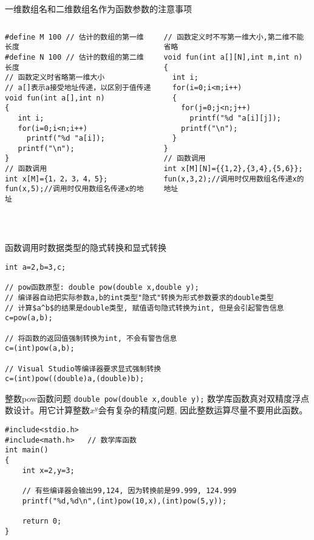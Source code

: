 \begin{frame}{一维数组名和二维数组名作为函数参数的注意事项}
\vspace{-0.4cm}
\begin{columns}[T]
\begin{lstlisting}
#define M 100 // 估计的数组的第一维长度
#define N 100 // 估计的数组的第二维长度
// 函数定义时省略第一维大小
// a[]表示a接受地址传递，以区别于值传递
void fun(int a[],int n)
{
   int i;
   for(i=0;i<n;i++) 
     printf("%d "a[i]);
   printf("\n");
}
// 函数调用
int x[M]={1，2，3，4，5};
fun(x,5);//调用时仅用数组名传递x的地址
\end{lstlisting}
\begin{lstlisting}[frame=leftline]
// 函数定义时不写第一维大小,第二维不能省略
void fun(int a[][N],int m,int n)
{
  int i;
  for(i=0;i<m;i++)
  {
    for(j=0;j<n;j++) 
      printf("%d "a[i][j]);
    printf("\n");
  }
}
// 函数调用
int x[M][N]={{1,2},{3,4},{5,6}};
fun(x,3,2);//调用时仅用数组名传递x的地址
\end{lstlisting}
\end{columns}
~\\
\end{frame}

\begin{frame}{函数调用时数据类型的隐式转换和显式转换}
\begin{lstlisting}
int a=2,b=3,c;

// pow函数原型: double pow(double x,double y);
// 编译器自动把实际参数a,b的int类型"隐式"转换为形式参数要求的double类型
// 计算$a^b$的结果是double类型, 赋值语句隐式转换为int, 但是会引起警告信息
c=pow(a,b);  

// 将函数的返回值强制转换为int, 不会有警告信息
c=(int)pow(a,b); 

// Visual Studio等编译器要求显式强制转换
c=(int)pow((double)a,(double)b); 

\end{lstlisting}
\end{frame}

\begin{frame}{整数pow函数问题}
\vspace{-0.3cm}
\lstinline|double pow(double x,double y);| 数学库函数真对双精度浮点数设计。用它计算整数$x^y$会有复杂的精度问题, 因此整数运算尽量不要用此函数。 
\begin{lstlisting}
#include<stdio.h>
#include<math.h>   // 数学库函数
int main()
{
	int x=2,y=3;
	
	// 有些编译器会输出99,124, 因为转换前是99.999, 124.999 
	printf("%d,%d\n",(int)pow(10,x),(int)pow(5,y)); 
		
	return 0;
}
\end{lstlisting}
\end{frame}

